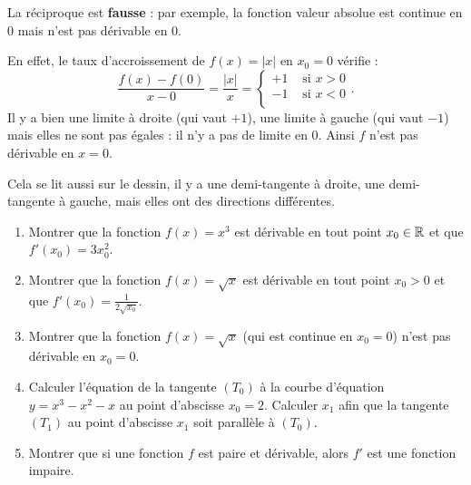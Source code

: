 \documentclass[class=report,crop=false]{standalone}
\begin{document}
\begin{remarque*}
La réciproque est \textbf{fausse} : par exemple, la fonction valeur absolue
est continue en $0$ mais n'est pas dérivable en $0$.


En effet, le taux d'accroissement de $f(x)=|x|$ en $x_0=0$ vérifie :
$$\frac{f(x)-f(0)}{x-0} = \frac{|x|}{x}=
\begin{cases}
+1 & \text{ si } x>0 \\
-1 & \text{ si } x < 0 \\
\end{cases}.
$$
Il y a bien une limite à droite (qui vaut $+1$), une limite à gauche (qui vaut $-1$) mais elles ne sont pas égales :
il n'y a pas de limite en $0$. Ainsi $f$ n'est pas dérivable en $x=0$.

Cela se lit aussi sur le dessin, il y a une demi-tangente à droite, une demi-tangente à gauche,
mais elles ont des directions différentes.
\end{remarque*}



\begin{miniexercices}
\sauteligne
\begin{enumerate}
  \item Montrer que la fonction $f(x)=x^3$ est dérivable en tout point $x_0\in \mathbb{R}$ et que $f'(x_0)=3x_0^2$.
  \item Montrer que la fonction $f(x)=\sqrt x$ est dérivable en tout point $x_0 >0$ et que $f'(x_0)=\frac{1}{2\sqrt{x_0}}$.
  \item Montrer que la fonction $f(x)=\sqrt x$ (qui est continue en $x_0=0$) n'est pas dérivable en $x_0=0$.
  \item Calculer l'équation de la tangente $(T_0)$ à la courbe d'équation $y=x^3-x^2-x$ au point d'abscisse $x_0=2$.
Calculer $x_1$ afin que la tangente $(T_1)$ au point d'abscisse $x_1$ soit parallèle à $(T_0)$.
  \item Montrer que si une fonction $f$ est paire et dérivable, alors $f'$ est une fonction impaire.
\end{enumerate}
\end{miniexercices}


\end{document}
